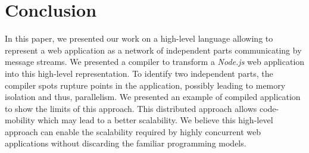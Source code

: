 \section{Conclusion} \label{section:conclusion}


In this paper, we presented our work on a high-level language allowing to represent a web application as a network of independent parts communicating by message streams.
We presented a compiler to transform a \textit{Node.js} web application into this high-level representation.
To identify two independent parts, the compiler spots rupture points in the application, possibly leading to memory isolation and thus, parallelism.
We presented an example of compiled application to show the limits of this approach.
This distributed approach allows code-mobility which may lead to a better scalability.
We believe this high-level approach can enable the scalability required by highly concurrent web applications without discarding the familiar programming models.

\endinput

Many frameworks for distributed systems focus mainly on the performances\cite{Akidau2013, Jain2006, Marz2011, Welsh2000, Wu2007, Zaharia2010}.
However, we focus on a compilation approach to replace the shift in programming model rather than the performance of the runtime.
We present in this section an extremely simplified but generic execution model inspired by the literature, only to support the confirmation of feasibility for the compilation process detailed in section \ref{section:compiler}.
The execution model is not distributed on remote machines, however it can isolate the execution of fluxions in different processes to reproduce the conditions of a distributed execution model.
We are interested in the problems arising from this isolation.

